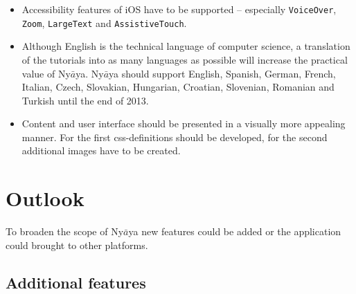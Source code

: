 \begin{itemize}

\item Accessibility features of iOS have to be supported – especially 
\verb+VoiceOver+, \verb+Zoom+, \verb+LargeText+ and \verb+AssistiveTouch+.

\item Although English is the technical language of computer science,
a translation of the tutorials into as many languages as possible will increase the practical value of Ny$\bar{a}$ya.
Ny$\bar{a}$ya should support English, Spanish, German, French, Italian, Czech, Slovakian, Hungarian, Croatian, Slovenian, Romanian and Turkish
until the end of 2013.
%
%


\item Content and user interface should be presented in a visually more appealing manner.
For the first css-definitions should be developed, for the second additional images have to be created.

\end{itemize}
%
%
%
%
%

\section{Outlook}

To broaden the scope of Ny$\bar{a}$ya new features could be added or the application could brought to other platforms.

\subsection{Additional features}

